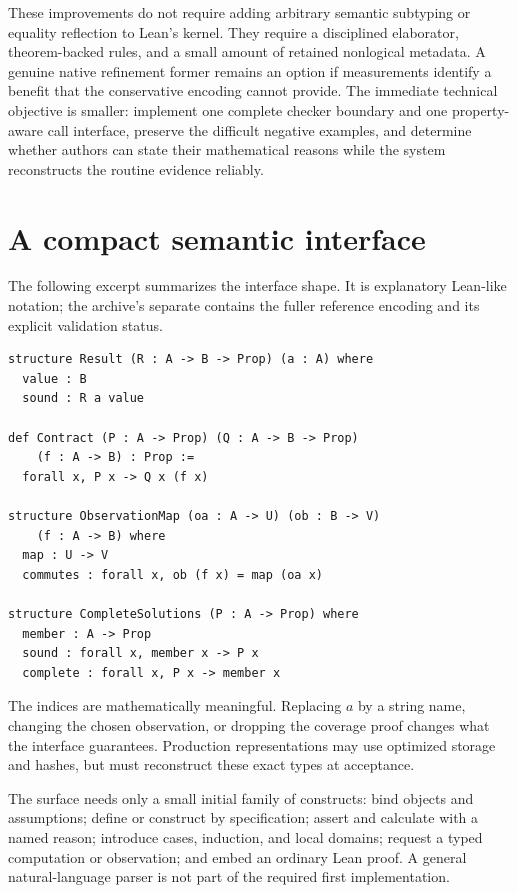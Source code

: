 \documentclass[11pt,a4paper]{article}
\theoremstyle{plain}
\theoremstyle{definition}
\begin{document}
These improvements do not require adding arbitrary semantic subtyping or equality reflection to Lean's kernel. They require a disciplined elaborator, theorem-backed rules, and a small amount of retained nonlogical metadata. A genuine native refinement former remains an option if measurements identify a benefit that the conservative encoding cannot provide. The immediate technical objective is smaller: implement one complete checker boundary and one property-aware call interface, preserve the difficult negative examples, and determine whether authors can state their mathematical reasons while the system reconstructs the routine evidence reliably.

\clearpage
\appendix
\section{A compact semantic interface}\label{app:interface}
The following excerpt summarizes the interface shape. It is explanatory Lean-like notation; the archive's separate  contains the fuller reference encoding and its explicit validation status.
\par\noindent\begin{minipage}{\linewidth}
\begin{lstlisting}
structure Result (R : A -> B -> Prop) (a : A) where
  value : B
  sound : R a value

def Contract (P : A -> Prop) (Q : A -> B -> Prop)
    (f : A -> B) : Prop :=
  forall x, P x -> Q x (f x)

structure ObservationMap (oa : A -> U) (ob : B -> V)
    (f : A -> B) where
  map : U -> V
  commutes : forall x, ob (f x) = map (oa x)

structure CompleteSolutions (P : A -> Prop) where
  member : A -> Prop
  sound : forall x, member x -> P x
  complete : forall x, P x -> member x
\end{lstlisting}
\end{minipage}\par
The indices are mathematically meaningful. Replacing $a$ by a string name, changing the chosen observation, or dropping the coverage proof changes what the interface guarantees. Production representations may use optimized storage and hashes, but must reconstruct these exact types at acceptance.

The surface needs only a small initial family of constructs: bind objects and assumptions; define or construct by specification; assert and calculate with a named reason; introduce cases, induction, and local domains; request a typed computation or observation; and embed an ordinary Lean proof. A general natural-language parser is not part of the required first implementation.
\end{document}
